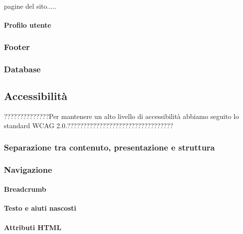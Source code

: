 pagine del sito.....

\paragraph{Profilo utente}

\subsubsection{Footer}

\subsubsection{Database}


\subsection{Accessibilità}
??????????????Per mantenere un alto livello di accessibilità abbiamo seguito lo standard WCAG 2.0.?????????????????????????????????

\subsubsection{Separazione tra contenuto, presentazione e struttura}

\subsubsection{Navigazione}

\paragraph{Breadcrumb} 

\paragraph{Testo e aiuti nascosti} 

\paragraph{Attributi HTML} 
